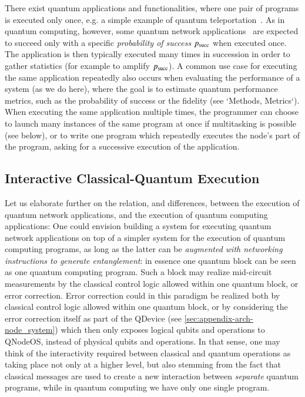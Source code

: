 There exist quantum applications and functionalities, where one pair of programs is executed only once, e.g. a simple example of quantum teleportation~\cite{bennett_1993_teleportation}. As in quantum computing, however, some quantum network applications~\cite{wehner_2018_stages} are expected to succeed only with a specific \emph{probability of success} $p_{\rm succ}$ when executed once. The application is then typically executed many times in succession in order to gather statistics (for example to amplify $p_{\rm succ}$). A common use case for executing the same application repeatedly also occurs when evaluating the performance of a system (as we do here), where the goal is to estimate quantum performance metrics, such as the probability of success or the fidelity (see `Methods, Metrics`).
When executing the same application multiple times, the programmer can choose to launch many instances of the same program at once if multitasking is possible (see below), or to write one program which repeatedly executes the node's part of the program, asking for a successive execution of the application.

\subsection{Interactive Classical-Quantum Execution}

Let us elaborate further on the relation, and differences, between the execution of quantum network applications, and the execution of quantum computing applications: One could envision building a system for executing quantum network applications on top of a simpler system for the execution of quantum computing programs, as long as the latter can be \emph{augmented with networking instructions to generate entanglement}: in essence one quantum block can be seen as one quantum computing program. Such a block may realize mid-circuit measurements by the classical control logic allowed within one quantum block, or error correction. Error correction could in this paradigm be realized both by classical control logic allowed within one quantum block, or by considering the error correction itself as part of the \ac{QDevice} (see \cref{sec:appendix-arch-node_system}) which then only exposes logical qubits and operations to \ac{QNodeOS}, instead of physical qubits and operations. In that sense, one may think of the interactivity required between classical and quantum operations as taking place not only at a higher level, but also stemming from the fact that classical messages are used to create a new interaction between \emph{separate} quantum programs, while in quantum computing we have only one single program.

